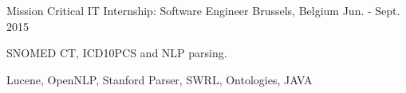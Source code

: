 \begin{cventries}
  \cventrysix%
    {Mission Critical IT} %
    {Internship: Software Engineer} %
    {Brussels, Belgium} %
    {Jun. - Sept. 2015} %
    {
      \begin{cvitems} %
        \item {SNOMED CT, ICD10PCS and NLP parsing.}
      \end{cvitems}
    }%
    {Lucene, OpenNLP, Stanford Parser, SWRL, Ontologies, JAVA}%










\end{cventries}

